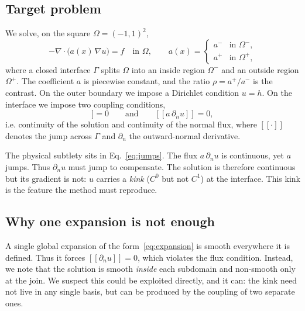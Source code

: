 \documentclass[pdflatex,sn-mathphys-num]{sn-jnl}%
\theoremstyle{thmstyleone}%
\theoremstyle{thmstyletwo}%
\theoremstyle{thmstylethree}%
\begin{document}
\subsection{Target problem}\label{subsec:target}
We solve, on the square $\Omega=(-1,1)^2$,
\begin{equation}
-\nabla\!\cdot\!\big(a(x)\,\nabla u\big) = f \quad\text{in }\Omega,
\qquad
a(x)=\begin{cases} a^- & \text{in } \Omega^-,\\[2pt] a^+ & \text{in } \Omega^+, \end{cases}
\label{eq:pde}
\end{equation}
where a closed interface $\Gamma$ splits $\Omega$ into an inside region $\Omega^-$ and an outside region $\Omega^+$. The coefficient $a$ is piecewise constant, and the ratio $\rho=a^+/a^-$ is the contrast. On the outer boundary we impose a Dirichlet condition $u=h$. On the interface we impose two coupling conditions,
\begin{equation}
[\![u]\!]=0
\qquad\text{and}\qquad
[\![a\,\partial_n u]\!]=0,
\label{eq:jumps}
\end{equation}
i.e. continuity of the solution and continuity of the normal flux, where $[\![\cdot]\!]$ denotes the jump across $\Gamma$ and $\partial_n$ the outward-normal derivative.

The physical subtlety sits in Eq.~\eqref{eq:jumps}. The flux $a\,\partial_n u$ is continuous, yet $a$ jumps. Thus $\partial_n u$ must jump to compensate. The solution is therefore continuous but its gradient is not: $u$ carries a \emph{kink} ($C^0$ but not $C^1$) at the interface. This kink is the feature the method must reproduce.

\subsection{Why one expansion is not enough}\label{subsec:why-two}
A single global expansion of the form~\eqref{eq:expansion} is smooth everywhere it is defined. Thus it forces $[\![\partial_n u]\!]=0$, which violates the flux condition. Instead, we note that the solution is smooth \emph{inside} each subdomain and non-smooth only at the join. We suspect this could be exploited directly, and it can: the kink need not live in any single basis, but can be produced by the coupling of two separate ones.
\end{document}
